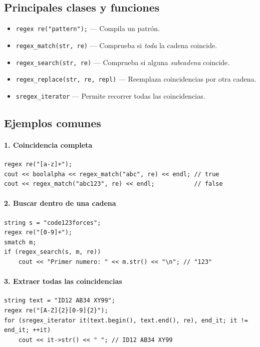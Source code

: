 \documentclass{article}
\begin{document}
\subsection{Principales clases y funciones}

\begin{itemize}
  \item \lstinline|regex re("pattern");| — Compila un patrón.
  \item \lstinline|regex_match(str, re)| — Comprueba si \emph{toda} la cadena coincide.
  \item \lstinline|regex_search(str, re)| — Comprueba si alguna \emph{subcadena} coincide.
  \item \lstinline|regex_replace(str, re, repl)| — Reemplaza coincidencias por otra cadena.
  \item \lstinline|sregex_iterator| — Permite recorrer todas las coincidencias.
\end{itemize}

\subsection{Ejemplos comunes}

\paragraph{1. Coincidencia completa}
\begin{lstlisting}[style=cppstyle]
regex re("[a-z]+");
cout << boolalpha << regex_match("abc", re) << endl; // true
cout << regex_match("abc123", re) << endl;           // false
\end{lstlisting}

\paragraph{2. Buscar dentro de una cadena}
\begin{lstlisting}[style=cppstyle]
string s = "code123forces";
regex re("[0-9]+");
smatch m;
if (regex_search(s, m, re))
    cout << "Primer numero: " << m.str() << "\n"; // "123"
\end{lstlisting}

\paragraph{3. Extraer todas las coincidencias}
\begin{lstlisting}[style=cppstyle]
string text = "ID12 AB34 XY99";
regex re("[A-Z]{2}[0-9]{2}");
for (sregex_iterator it(text.begin(), text.end(), re), end_it; it != end_it; ++it)
    cout << it->str() << " "; // ID12 AB34 XY99
\end{lstlisting}
\end{document}
